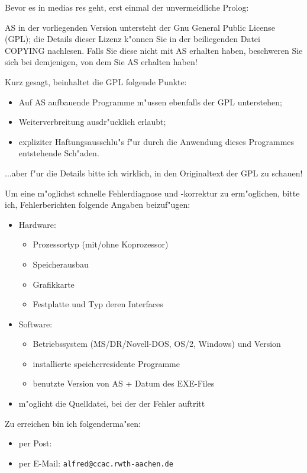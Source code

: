 \documentclass[12pt,a4paper,twoside]{report}
\newcommand{\tty}[1]{{\tt #1}}
\begin{document}
Bevor es in medias res geht, erst einmal der unvermeidliche Prolog:
\par
AS in der vorliegenden Version untersteht der Gnu General Public License
(GPL); die Details dieser Lizenz k"onnen Sie in der beiliegenden Datei
COPYING nachlesen.  Falls Sie diese nicht mit AS erhalten haben,
beschweren Sie sich bei demjenigen, von dem Sie AS erhalten haben!
\par
Kurz gesagt, beinhaltet die GPL folgende Punkte:
\begin{itemize}
\item{Auf AS aufbauende Programme m"ussen ebenfalls der GPL unterstehen;}
\item{Weiterverbreitung ausdr"ucklich erlaubt;}
\item{expliziter Haftungsausschlu"s f"ur durch die Anwendung dieses 
      Programmes entstehende Sch"aden.}
\end{itemize}
...aber f"ur die Details bitte ich wirklich, in den Originaltext der GPL
zu schauen!
\par
Um eine m"oglichst schnelle Fehlerdiagnose und -korrektur zu erm"oglichen,
bitte ich, Fehlerberichten folgende Angaben beizuf"ugen:
\begin{itemize}
\item{Hardware: \begin{itemize}
                \item{Prozessortyp (mit/ohne Koprozessor)}
                \item{Speicherausbau}
                \item{Grafikkarte}
                \item{Festplatte und Typ deren Interfaces}
                \end{itemize}}
\item{Software: \begin{itemize}
                \item{Betriebssystem (MS/DR/Novell-DOS, OS/2, Windows)
		und Version}
                \item{installierte speicherresidente Programme}
                \item{benutzte Version von AS + Datum des EXE-Files}
                \end{itemize}}
\item{m"oglicht die Quelldatei, bei der der Fehler auftritt}
\end{itemize}
Zu erreichen bin ich folgenderma"sen:
\begin{itemize}
\item{per Post: }
\item{per E-Mail: \tty{alfred@ccac.rwth-aachen.de}}
\end{itemize}
\end{document}
